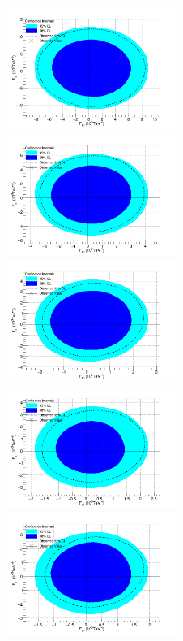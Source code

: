 \begin{figure}[h!]
\begin{center}
\includegraphics[width=0.495\textwidth]{figures/combination/Comb500-Lim.png}
\includegraphics[width=0.495\textwidth]{figures/combination/Comb100-Lim.png}\\
\includegraphics[width=0.495\textwidth]{figures/combination/Comb200-Lim.png}
\includegraphics[width=0.495\textwidth]{figures/combination/Comb300-Lim.png}\\
\includegraphics[width=0.495\textwidth]{figures/combination/CombUnit-Lim.png}

\end{center}
\end{figure}
